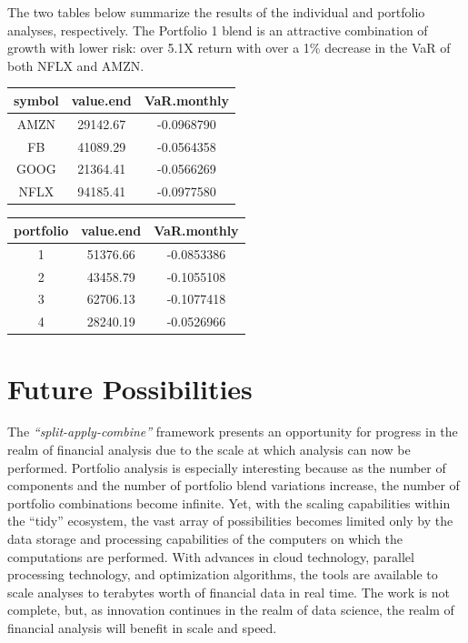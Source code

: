 \hspace{20 mm}

The two tables below summarize the results of the individual and
portfolio analyses, respectively. The Portfolio 1 blend is an attractive
combination of growth with lower risk: over 5.1X return with over a 1\%
decrease in the VaR of both NFLX and AMZN.

\hspace{20 mm}

\begin{tabular}{ccc}
\toprule
symbol & value.end & VaR.monthly\\
\midrule
AMZN & 29142.67 & -0.0968790\\
FB & 41089.29 & -0.0564358\\
GOOG & 21364.41 & -0.0566269\\
NFLX & 94185.41 & -0.0977580\\
\bottomrule
\end{tabular}

\hspace{20 mm}

\begin{tabular}{ccc}
\toprule
portfolio & value.end & VaR.monthly\\
\midrule
1 & 51376.66 & -0.0853386\\
2 & 43458.79 & -0.1055108\\
3 & 62706.13 & -0.1077418\\
4 & 28240.19 & -0.0526966\\
\bottomrule
\end{tabular}

\hspace{20 mm}

\section{Future Possibilities}\label{future-possibilities}

The \emph{``split-apply-combine''} framework presents an opportunity for
progress in the realm of financial analysis due to the scale at which
analysis can now be performed. Portfolio analysis is especially
interesting because as the number of components and the number of
portfolio blend variations increase, the number of portfolio
combinations become infinite. Yet, with the scaling capabilities within
the ``tidy'' ecosystem, the vast array of possibilities becomes limited
only by the data storage and processing capabilities of the computers on
which the computations are performed. With advances in cloud technology,
parallel processing technology, and optimization algorithms, the tools
are available to scale analyses to terabytes worth of financial data in
real time. The work is not complete, but, as innovation continues in the
realm of data science, the realm of financial analysis will benefit in
scale and speed.

